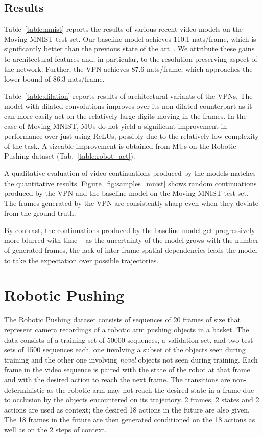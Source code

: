 \documentclass{article}
\begin{document}
\subsection{Results}

Table~\ref{table:mnist} reports the results of various recent video models on the Moving MNIST test set. Our baseline model achieves 110.1 nats/frame, which is  significantly better than the previous state of the art~\citep{DBLP:journals/corr/PatrauceanHC15}. We attribute these gains to architectural features and, in particular, to the resolution preserving aspect of the network. Further, the VPN achieves 87.6 nats/frame, which approaches the lower bound of 86.3 nats/frame. 

Table~\ref{table:dilation} reports results of architectural variants of the VPNs. The model with dilated convolutions improves over its non-dilated counterpart as it can more easily act on the relatively large digits moving in the  frames. In the case of Moving MNIST, MUs do not yield a significant improvement in performance over just using ReLUs, possibly due to the relatively low complexity of the task. A sizeable improvement is obtained from MUs on the Robotic Pushing dataset (Tab.~\ref{table:robot_act}).

A qualitative evaluation of video continuations produced by the models matches the quantitative results. Figure~\ref{fig:samples_mnist} shows random continuations produced by the VPN and the baseline model on the Moving MNIST test set. The frames generated by the VPN are consistently sharp even when they deviate from the ground truth.

By contrast, the continuations produced by the baseline model get progressively more blurred with time -- as the uncertainty of the model grows with the number of generated frames, the lack of inter-frame spatial dependencies leads the model to take the expectation over possible trajectories.

\section{Robotic Pushing}
\label{sec:robotic_pushing}

The Robotic Pushing dataset consists of sequences of 20 frames of size  that represent camera recordings of a robotic arm pushing objects in a basket. The data consists of a training set of 50000 sequences, a validation set, and two test sets of 1500 sequences each, one involving a subset of the objects seen during training and the other one involving \emph{novel} objects not seen during training. Each frame in the video sequence is paired with the state of the robot at that frame and with the desired action to reach the next frame. The transitions are non-deterministic as the robotic arm may not reach the desired state in a frame due to occlusion by the objects encountered on its trajectory. 2 frames, 2 states and 2 actions are used as context; the desired 18 actions in the future are also given. The 18 frames in the future are then generated conditioned on the 18 actions as well as on the 2 steps of context. 
\end{document}

